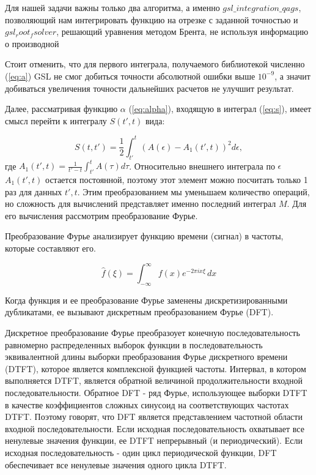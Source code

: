 \documentclass[%
bachelor,    %
natbib,      %
subf,        %
href,        %
colorlinks,  %
]{disser}
\begin{document}
Для нашей задачи важны только два алгоритма, а именно $gsl\_integration\_qags$, позволяющий нам интегрировать функцию на отрезке с заданной точностью и $gsl_root_fsolver$, решающий уравнения методом Брента, не используя информацию о производной \cite{gsl:website}

Стоит отменить, что для первого интеграла, получаемого библиотекой численно (\ref{eq:a}) GSL не смог добиться точности абсолютной ошибки выше $10^{-9}$, а значит добиваться увеличения точности дальнейших расчетов не улучшит результат.

Далее, рассматривая функцию $\alpha$ (\ref{eq:alpha}), входящую в интеграл (\ref{eq:s}), имеет смысл перейти к интегралу $S(t', t)$ вида:

\begin{equation}\label{eq:s_integrate2}
S(t, t') = \frac{1}{2}\int_{t'}^{t} \left( A(\epsilon) - A_1(t', t) \right)^2 d\epsilon,
\end{equation}
где $A_1(t', t) = \frac{1}{t'-t}\int_{t'}^{t}A(\tau) d\tau$. Относительно внешнего интеграла по $\epsilon$ $A_1(t', t)$ остается постоянной, поэтому этот элемент можно посчитать только 1 раз для данных $t' ,t$. Этим преобразованием мы уменьшаем количество операций, но сложность для вычислений представляет именно последний интеграл $M$. Для его вычисления рассмотрим преобразование Фурье.

Преобразование Фурье анализирует функцию времени (сигнал) в частоты, которые составляют его.

$$\hat{f}(\xi) =\int_{-\infty}^{\infty}f(x)e^{-2\pi ix\xi }\,dx$$

Когда функция и ее преобразование Фурье заменены дискретизированными дубликатами, ее вызывают дискретным преобразованием Фурье (DFT). 

Дискретное преобразование Фурье преобразоует конечную последовательность равномерно распределенных выборок функции в последовательность эквивалентной длины выборки преобразования Фурье дискретного времени (DTFT), которое является комплексной функцией частоты. Интервал, в котором выполняется DTFT, является обратной величиной продолжительности входной последовательности. Обратное DFT - ряд Фурье, использующее выборки DTFT в качестве коэффициентов сложных синусоид на соответствующих частотах DTFT. Поэтому говорят, что DFT является представлением частотной области входной последовательности. Если исходная последовательность охватывает все ненулевые значения функции, ее DTFT непрерывный (и периодический). Если исходная последовательность - один цикл периодической функции, DFT обеспечивает все ненулевые значения одного цикла DTFT.
\end{document}

